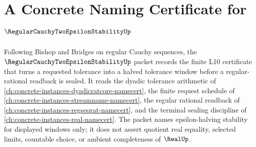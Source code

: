 \chapter{A Concrete Naming Certificate for $\RegularCauchyTwoEpsilonStabilityUp$}
\label{ch:concrete-instances-regular-cauchy-two-epsilon-stability-namecert}

Following Bishop and Bridges on regular Cauchy sequences, the $\RegularCauchyTwoEpsilonStabilityUp$ packet records the finite L10 certificate that turns a requested tolerance into a halved tolerance window before a regular-rational readback is sealed. It reads the dyadic tolerance arithmetic of \autoref{ch:concrete-instances-dyadicratcore-namecert}, the finite request schedule of \autoref{ch:concrete-instances-streamname-namecert}, the regular rational readback of \autoref{ch:concrete-instances-regseqrat-namecert}, and the terminal sealing discipline of \autoref{ch:concrete-instances-real-namecert}. The packet names epsilon-halving stability for displayed windows only; it does not assert quotient real equality, selected limits, countable choice, or ambient completeness of $\RealUp$.


